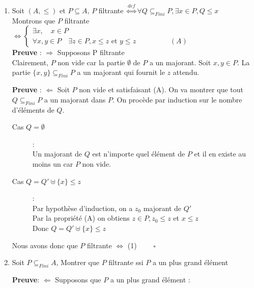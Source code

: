 \documentclass[12pt]{article}
\begin{document}
\begin{enumerate}
    \item Soit $(A,\leq)$ et $P \subseteq A$, $P$ filtrante $\overset{def}{\iff} \forall Q \subseteq_{Fini} P, \exists x \in P, Q \leq x$\\ 

        Montrons que $P$ filtrante $\iff 
        \begin{cases}
        \exists x,\quad x\in P\\
        \forall x,y \in P \quad \exists z \in P, x \leq z \text{ et } y\leq z \hspace{2cm} (A)
        
        \end{cases}$\\ 

	\textbf{Preuve} : $\Rightarrow $ Supposons P filtrante \\ 
Clairement, $P$ non vide car la partie $\emptyset$ de $P$ a un majorant. Soit $x,y \in P$. La partie $\{x,y\} \subseteq_{Fini} P$ a un majorant qui fournit le $z$ attendu.


	\textbf{Preuve} : $\Leftarrow $ Soit $P$ non vide et satisfaisant (A). On va montrer que tout $Q \subseteq_{Fini} P$ a un majorant dans $P$. On procède par induction sur le nombre d'éléments de $Q$. 

\begin{description}
    \item[Cas $Q = \emptyset $]: \\
        Un majorant de $Q$ est n'importe quel élément de $P$ et il en existe au moins un car $P$ non vide. 
    \item[Cas $Q = Q' \uplus \{x\} \leq z $ ]:\\ 
        Par hypothèse d'induction, on a $z_0$ majorant de $Q'$\\ 
        Par la propriété (A) on obtiens $z \in P, z_0 \leq z $ et $x \leq z$\\ 
        Donc $Q = Q'\uplus \{x\} \leq z$
\end{description}

Nous avons donc que $P$ filtrante $\iff$ (1) $\qquad \square$\\ 



\item Soit $P \subseteq_{Fini} A$, Montrer que $P$ filtrante ssi $P$ a un plus grand élément 

	\textbf{Preuve}: $\Leftarrow $ Supposons que $P$ a un plus grand élément :


\end{enumerate}
\end{document}
